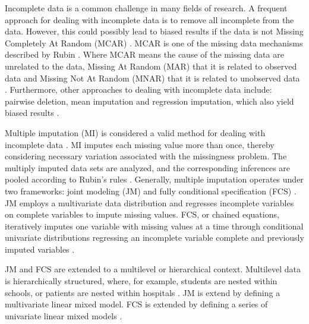 \documentclass[10pt, a4paper, titlepage]{article}
\begin{document}
Incomplete data is a common challenge in many fields of research. A frequent approach for dealing with incomplete data is to remove all incomplete from the data. However, this could possibly lead to biased results if the data is not Missing Completely At Random (MCAR) \citep{buurenFlexibleImputationMissing2018, kang2013, enders2017, austin2021}. MCAR is one of the missing data mechanisms described by Rubin \citep{rubin1976}. Where MCAR means the cause of the missing data are unrelated to the data, Missing At Random (MAR) that it is related to observed data and Missing Not At Random (MNAR) that it is related to unobserved data \citep{buurenFlexibleImputationMissing2018, rubin1976}. Furthermore, other approaches to dealing with incomplete data include: pairwise deletion, mean imputation and regression imputation, which also yield biased results \citep{buurenFlexibleImputationMissing2018}.

Multiple imputation (MI) is considered a valid method for dealing with incomplete data \citep{mistlerComparisonJointModel2017, buurenFlexibleImputationMissing2018, enders2017, burgette2010, austin2021, audigier2018, vanbuuren2007, grund2021, hughes2014}. MI imputes each missing value more than once, thereby considering necessary variation associated with the missingness problem. The multiply imputed data sets are analyzed, and the corresponding inferences are pooled according to Rubin's rules \citep{buurenFlexibleImputationMissing2018, austin2021, rubin1987}.
Generally, multiple imputation operates under two frameworks: joint modeling (JM) and fully conditional specification (FCS) \citep{mistlerComparisonJointModel2017, buurenFlexibleImputationMissing2018, enders2018, enders2018a, hughes2014}. JM employs a multivariate data distribution and regresses incomplete variables on complete variables to impute missing values. FCS, or chained equations, iteratively imputes one variable with missing values at a time through conditional univariate distributions regressing an incomplete variable complete and previously imputed variables \citep{mistlerComparisonJointModel2017, buurenFlexibleImputationMissing2018, enders2018, enders2018a, hughes2014}.

JM and FCS are extended to a multilevel or hierarchical context. Multilevel data is hierarchically structured, where, for example, students are nested within schools, or patients are nested within hospitals \citep{hox2017}. JM is extend by defining a multivariate linear mixed model. FCS is extended by defining a series of univariate linear mixed models \citep{mistlerComparisonJointModel2017}.
\end{document}
